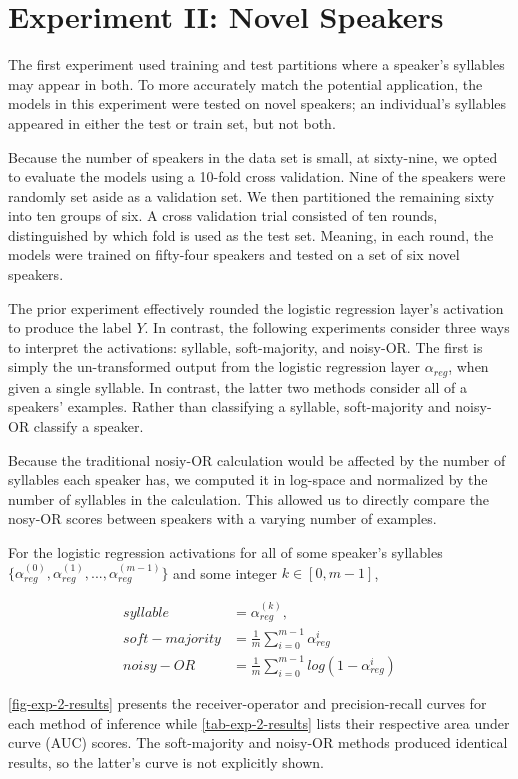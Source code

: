 \section{Experiment II: Novel Speakers}
The first experiment used training and test partitions where a speaker's syllables may appear in both. To more accurately match the potential application, the models in this experiment were tested on novel speakers; an individual's syllables appeared in either the test or train set, but not both. 

Because the number of speakers in the data set is small, at sixty-nine, we opted to evaluate the models using a 10-fold cross validation. Nine of the speakers were randomly set aside as a validation set. We then partitioned the remaining sixty into ten groups of six. A cross validation trial consisted of ten rounds, distinguished by which fold is used as the test set. Meaning, in each round, the models were trained on fifty-four speakers and tested on a set of six novel speakers.

The prior experiment effectively rounded the logistic regression layer's activation to produce the label $Y$. In contrast, the following experiments consider three ways to interpret the activations: syllable, soft-majority, and noisy-OR. The first is simply the un-transformed output from the logistic regression layer $\alpha_{reg}$, when given a single syllable. In contrast, the latter two methods consider all of a speakers' examples. Rather than classifying a syllable, soft-majority and noisy-OR classify a speaker. 

Because the traditional nosiy-OR calculation would be affected by the number of syllables each speaker has, we computed it in log-space and normalized by the number of syllables in the calculation. This allowed us to directly compare the nosy-OR scores between speakers with a varying number of examples.

For the logistic regression activations for all of some speaker's syllables $\{\alpha_{reg}^{(0)}, \alpha_{reg}^{(1)},...,\alpha_{reg}^{(m-1)}\}$ and some integer $k \in [0,m-1]$,

\begin{align}
syllable &= \alpha_{reg}^{(k)},\\
soft-majority &= \frac{1}{m} \sum_{i=0}^{m-1} \alpha_{reg}^{i} \\
noisy-OR &= \frac{1}{m} \sum_{i=0}^{m-1} log(1-\alpha_{reg}^{i})
\end{align}

\ref{fig-exp-2-results} presents the receiver-operator and precision-recall curves for each method of inference while \ref{tab-exp-2-results} lists their respective area under curve (AUC) scores. The soft-majority and noisy-OR methods produced identical results, so the latter's curve is not explicitly shown. 

